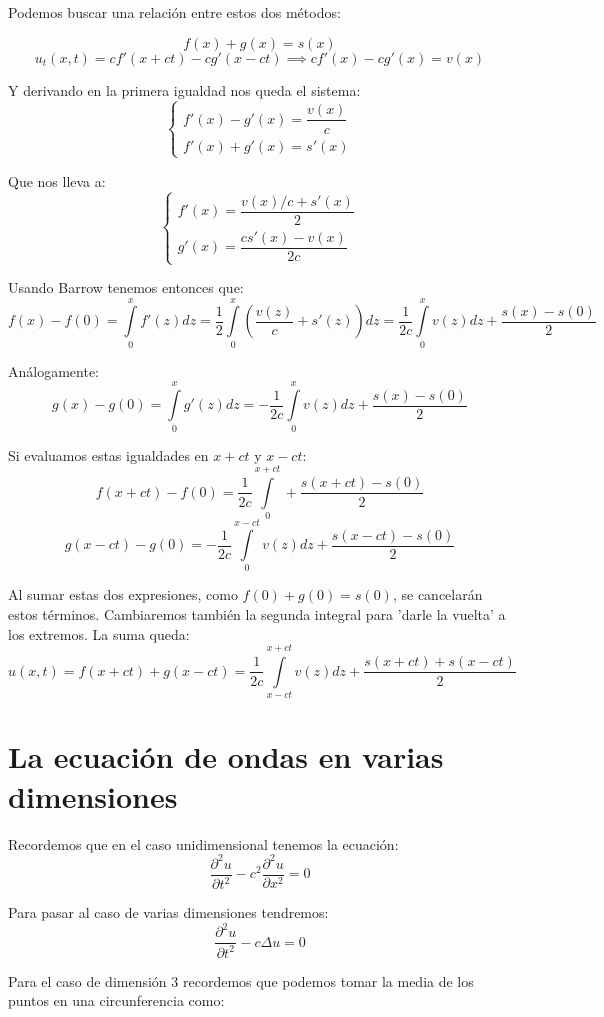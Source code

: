 \documentclass[openany]{book}
\begin{document}
Podemos buscar una relación entre estos dos métodos:

$$ f(x)+g(x) = s(x) $$
$$ u_{t}(x,t)  = cf'(x+ct) - cg'(x-ct) \implies cf'(x)-cg'(x) = v(x)$$

Y derivando en la primera igualdad nos queda el sistema:
$$ \left\{
\begin{array}{l}
  f'(x)-g'(x) = \dfrac{v(x)}{c}\\ 
  f'(x) + g'(x) = s'(x)
\end{array}
\right. $$

Que nos lleva a:
$$ \left\{
\begin{array}{l}
  f'(x) = \dfrac{v(x)/c + s'(x)}{2} \\ 
  g'(x) = \dfrac{cs'(x)-v(x)}{2c}
\end{array}
\right. $$

Usando Barrow tenemos entonces que:
$$ f(x)-f(0) = \int\limits_{0}^{x}f'(z)dz = \dfrac{1}{2} \int\limits_{0}^{x} \left( \dfrac{v(z)}{c}+s'(z) \right)dz = \dfrac{1}{2c} \int\limits_{0}^{x}v(z)dz + \dfrac{s(x)-s(0)}{2} $$

Análogamente:
$$ g(x)-g(0) = \int\limits_{0}^{x}g'(z)dz = -\dfrac{1}{2c} \int\limits_{0}^{x}v(z)dz + \dfrac{s(x)-s(0)}{2} $$

Si evaluamos estas igualdades en $ x+ct $ y $ x-ct $:
$$ f(x+ct) -f(0) = \dfrac{1}{2c} \int\limits_{0}^{x+ct} + \dfrac{s(x+ct)-s(0)}{2} $$
$$ g(x-ct)-g(0) = -\dfrac{1}{2c} \int\limits_{0}^{x-ct}v(z)dz + \dfrac{s(x-ct)-s(0)}{2} $$

Al sumar estas dos expresiones, como $ f(0)+g(0) = s(0) $, se cancelarán estos términos. Cambiaremos también la segunda integral para 'darle la vuelta' a los extremos. La suma queda:
$$ u(x,t)= f(x+ct)+g(x-ct) = \dfrac{1}{2c} \int\limits_{x-ct}^{x+ct}v(z)dz + \dfrac{s(x+ct)+s(x-ct)}{2} $$

\section{La ecuación de ondas en varias dimensiones}

Recordemos que en el caso unidimensional tenemos la ecuación:
$$ \dfrac{\partial ^2 u}{\partial t^2}-c^2 \dfrac{\partial ^2u}{\partial x^2} = 0 $$

Para pasar al caso de varias dimensiones tendremos:
$$ \dfrac{\partial ^2 u}{\partial t^2}-c \Delta u = 0 $$

Para el caso de dimensión 3 recordemos que podemos tomar la media de los puntos en una circunferencia como:
\end{document}
